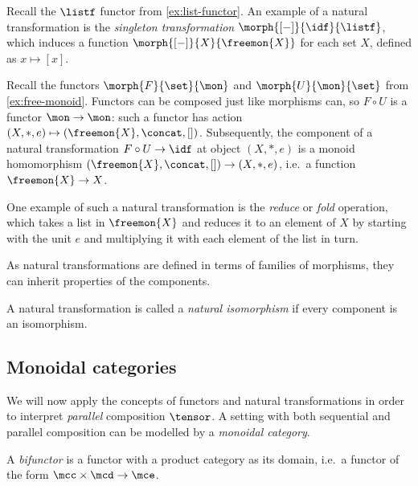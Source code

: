 
\begin{example}[Singleton]
    Recall the \(\listf\) functor from \cref{ex:list-functor}.
    An example of a natural transformation is the
    \emph{singleton transformation} \(\morph{[-]}{\idf}{\listf}\), which
    induces a function \(\morph{[-]}{X}{\freemon{X}}\) for each set \(X\),
    defined as \(x \mapsto [x]\).
\end{example}

\begin{example}[Reduce]
    Recall the functors \(\morph{F}{\set}{\mon}\) and \(\morph{U}{\mon}{\set}\)
    from \cref{ex:free-monoid}.
    Functors can be composed just like morphisms can, so \(F \circ U\) is a
    functor \(\mon \to \mon\): such a functor has action \(
        (X, *, e) \mapsto (\freemon{X}, \concat, [])
    \).
    Subsequently, the component of a natural transformation \(
        F \circ U \to \idf
    \) at object \((X, *, e)\) is a monoid homomorphism \(
        (\freemon{X}, \concat, []) \to (X, *, e)
    \), i.e.\ a function \(\freemon{X} \to X\).

    One example of such a natural transformation is the \emph{reduce} or
    \emph{fold} operation, which takes a list in \(\freemon{X}\) and reduces it
    to an element of \(X\) by starting with the unit \(e\) and multiplying it
    with each element of the list in turn.
\end{example}

As natural transformations are defined in terms of families of morphisms, they
can inherit properties of the components.

\begin{definition}
    A natural transformation is called a \emph{natural isomorphism} if every
    component is an isomorphism.
\end{definition}

\subsection{Monoidal categories}

We will now apply the concepts of functors and natural transformations in order
to interpret \emph{parallel} composition \(\tensor\).
A setting with both sequential and parallel composition can be modelled by a
\emph{monoidal category}.

\begin{definition}[Bifunctor]
    A \emph{bifunctor} is a functor with a product category as its domain, i.e.\
    a functor of the form \(\mcc \times \mcd \to \mce\).
\end{definition}

